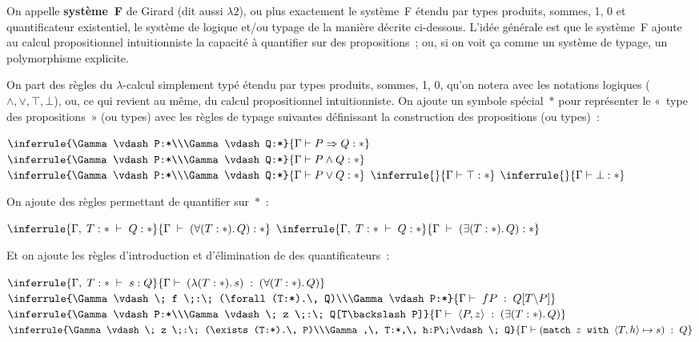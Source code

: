 \documentclass[12pt,a4paper]{article}
\theoremstyle{definition}
\begin{document}
On appelle \textbf{système F} de Girard (dit aussi $\lambda 2$), ou
plus exactement le système F étendu par types produits, sommes, 1, 0
et quantificateur existentiel, le système de logique et/ou typage de
la manière décrite ci-dessous.  L'idée générale est que le système F
ajoute au calcul propositionnel intuitionniste la capacité à
quantifier sur des propositions ; ou, si on voit ça comme un système
de typage, un polymorphisme explicite.

On part des règles du $\lambda$-calcul simplement typé étendu par
types produits, sommes, 1, 0, qu'on notera avec les notations logiques
($\land,\lor,\top,\bot$), ou, ce qui revient au même, du calcul
propositionnel intuitionniste.  On ajoute un symbole spécial $*$ pour
représenter le « type des propositions » (ou types) avec les règles de
typage suivantes définissant la construction des propositions (ou
types) :
\begin{center}
$\inferrule{\Gamma\vdash P:*\\\Gamma\vdash Q:*}{\Gamma\vdash P\Rightarrow Q:*}$
\quad
$\inferrule{\Gamma\vdash P:*\\\Gamma\vdash Q:*}{\Gamma\vdash P\land Q:*}$
\quad
$\inferrule{\Gamma\vdash P:*\\\Gamma\vdash Q:*}{\Gamma\vdash P\lor Q:*}$
\quad
$\inferrule{ }{\Gamma\vdash \top:*}$
\quad
$\inferrule{ }{\Gamma\vdash \bot:*}$
\end{center}
On ajoute des règles permettant de quantifier sur $*$ :
\begin{center}
$\inferrule{\Gamma,\;T:*\;\vdash\; Q:*}{\Gamma\;\vdash\; (\forall(T:*).\,Q):*}$
\quad
$\inferrule{\Gamma,\;T:*\;\vdash\; Q:*}{\Gamma\;\vdash\; (\exists(T:*).\,Q):*}$
\end{center}
Et on ajoute les règles d'introduction et d'élimination de des
quantificateurs :
\begin{center}
$\inferrule{\Gamma,\; T:*\;\vdash\; s:Q}{\Gamma\vdash\; (\lambda(T:*).\,s)\;:\;(\forall (T:*).\, Q)}$
\quad
$\inferrule{\Gamma\vdash\; f \;:\; (\forall (T:*).\, Q)\\\Gamma\vdash P:*}{\Gamma\vdash\; fP \;:\; Q[T\backslash P]}$
\quad
$\inferrule{\Gamma\vdash P:*\\\Gamma\vdash\; z \;:\; Q[T\backslash P]}{\Gamma\vdash\; \langle P,z\rangle \;:\; (\exists (T:*).\, Q)}$
\quad
$\inferrule{\Gamma\vdash\; z \;:\; (\exists (T:*).\, P)\\\Gamma,\, T:*,\, h:P\;\vdash\; Q}{\Gamma\vdash (\texttt{match~}z\texttt{~with~}\langle T,h\rangle \mapsto s) \;:\; Q}$
\end{center}
\end{document}
